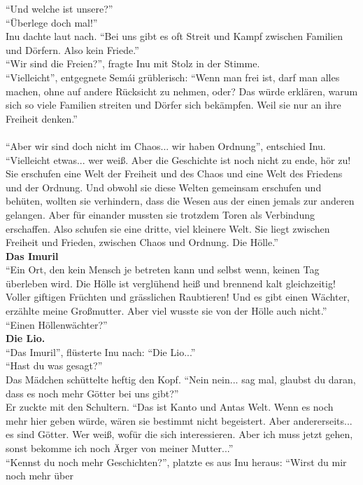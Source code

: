 ``Und welche ist unsere?''\\
``Überlege doch mal!''\\
Inu dachte laut nach. ``Bei uns gibt es oft Streit und Kampf zwischen Familien und Dörfern. Also 
kein Friede.''\\
``Wir sind die Freien?'', fragte Inu mit Stolz in der Stimme.\\
``Vielleicht'', entgegnete Semái grüblerisch: ``Wenn man frei ist, darf man alles machen, ohne auf 
andere Rücksicht zu nehmen, oder? Das würde erklären, warum sich so viele Familien streiten und 
Dörfer sich bekämpfen. Weil sie nur an ihre Freiheit denken.''\\\\
``Aber wir sind doch nicht im Chaos... wir haben Ordnung'', entschied Inu.
``Vielleicht etwas... wer weiß. Aber die Geschichte ist noch nicht zu ende, hör zu! Sie erschufen 
eine Welt der Freiheit und des Chaos und eine Welt des Friedens und der Ordnung. Und obwohl sie 
diese Welten gemeinsam erschufen und behüten, wollten sie verhindern, dass die Wesen aus der einen 
jemals zur anderen gelangen. Aber für einander mussten sie trotzdem Toren als Verbindung 
erschaffen. Also schufen sie eine dritte, viel kleinere Welt. Sie liegt zwischen Freiheit und 
Frieden, zwischen Chaos und Ordnung. Die Hölle.''\\
\textbf{Das Imuril}\\
``Ein Ort, den kein Mensch je betreten kann und selbst wenn, keinen Tag überleben wird. Die Hölle 
ist verglühend heiß und brennend kalt gleichzeitig! Voller giftigen Früchten und grässlichen 
Raubtieren! Und es gibt einen Wächter, erzählte meine Großmutter. Aber viel wusste sie von der 
Hölle auch nicht.''\\
``Einen Höllenwächter?''\\
\textbf{Die Lio.}\\
``Das Imuril'', flüsterte Inu nach: ``Die Lio...''\\
``Hast du was gesagt?''\\
Das Mädchen schüttelte heftig den Kopf. ``Nein nein... sag mal, glaubst du daran, dass es noch mehr 
Götter bei uns gibt?''\\
Er zuckte mit den Schultern. ``Das ist Kanto und Antas Welt. Wenn es noch mehr hier geben würde, 
wären sie bestimmt nicht begeistert. Aber andererseits... es sind Götter. Wer weiß, wofür die sich 
interessieren. Aber ich muss jetzt gehen, sonst bekomme ich noch Ärger von meiner Mutter...''\\
``Kennst du noch mehr Geschichten?'', platzte es aus Inu heraus: ``Wirst du mir noch mehr über 

